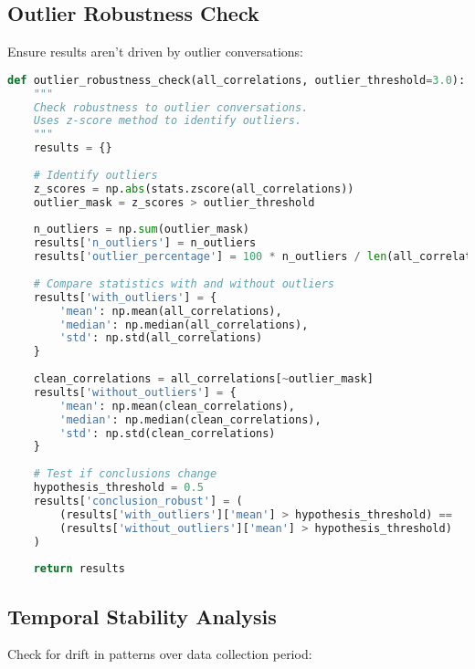 \documentclass[11pt,letterpaper]{article}
\begin{document}
\subsection{Outlier Robustness Check}

Ensure results aren't driven by outlier conversations:

\begin{lstlisting}[language=Python]
def outlier_robustness_check(all_correlations, outlier_threshold=3.0):
    """
    Check robustness to outlier conversations.
    Uses z-score method to identify outliers.
    """
    results = {}
    
    # Identify outliers
    z_scores = np.abs(stats.zscore(all_correlations))
    outlier_mask = z_scores > outlier_threshold
    
    n_outliers = np.sum(outlier_mask)
    results['n_outliers'] = n_outliers
    results['outlier_percentage'] = 100 * n_outliers / len(all_correlations)
    
    # Compare statistics with and without outliers
    results['with_outliers'] = {
        'mean': np.mean(all_correlations),
        'median': np.median(all_correlations),
        'std': np.std(all_correlations)
    }
    
    clean_correlations = all_correlations[~outlier_mask]
    results['without_outliers'] = {
        'mean': np.mean(clean_correlations),
        'median': np.median(clean_correlations),
        'std': np.std(clean_correlations)
    }
    
    # Test if conclusions change
    hypothesis_threshold = 0.5
    results['conclusion_robust'] = (
        (results['with_outliers']['mean'] > hypothesis_threshold) ==
        (results['without_outliers']['mean'] > hypothesis_threshold)
    )
    
    return results
\end{lstlisting}

\subsection{Temporal Stability Analysis}

Check for drift in patterns over data collection period:
\end{document}
